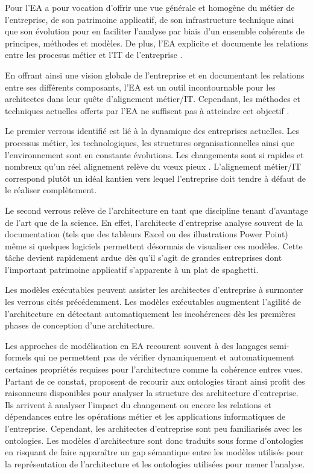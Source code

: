 	Pour \cite{lankhorst2013enterprise} l'EA a pour vocation d'offrir une vue générale et homogène du métier de l'entreprise, de son patrimoine applicatif, de son infrastructure technique ainsi que son évolution pour en faciliter l'analyse par biais d'un ensemble cohérents de principes, méthodes et modèles. De plus, l'EA explicite et documente les relations entre les procesus métier et l'IT de l'entreprise \cite{kaisler_enterprise_2005}. 
	
	En offrant ainsi une vision globale de l'entreprise et en documentant les relations entre ses différents composants, l'EA est un outil incontournable pour les architectes dans leur quête d'alignement métier/IT. Cependant, les méthodes et techniques actuelles offerts par l'EA ne suffisent pas à atteindre cet objectif \cite{barn2013enterprise}. 
	
	Le premier verrous identifié est lié à la dynamique des entreprises actuelles. Les processus métier, les technologiques, les structures organisationnelles ainsi que l'environnement sont en constante évolutions. Les changements sont si rapides et nombreux qu'un réel alignement relève du vœux pieux \cite{lankhorst2013enterprise}. L'alignement métier/IT correspond plutôt un idéal kantien vers lequel l'entreprise doit tendre à défaut de le réaliser complètement.
	
	Le second verrous relève de l'architecture en tant que discipline tenant d'avantage de l'art que de la science. En effet, l'architecte d'entreprise analyse souvent de la documentation (tels que des tableurs Excel ou des illustrations Power Point) même si quelques logiciels permettent désormais de visualiser ces modèles. Cette tâche devient rapidement ardue dès qu'il s'agit de grandes entreprises dont l'important patrimoine applicatif s'apparente à un plat de spaghetti.
	
	Les modèles exécutables peuvent assister les architectes d'entreprise à surmonter les verrous cités précédemment. Les modèles exécutables augmentent l'agilité de l'architecture en détectant automatiquement les incohérences dès les premières phases de conception d'une architecture. 
	
	Les approches de modélisation en EA recourent souvent à des langages semi-formels qui ne permettent pas de vérifier dynamiquement et automatiquement certaines propriétés requises pour l'architecture comme la cohérence entres vues. Partant de ce constat, \cite{sunkle_analyzing_2013} proposent de recourir aux ontologies tirant ainsi profit des raisonneurs disponibles pour analyser la structure des architecture d'entreprise. Ils arrivent à analyser l'impact du changement ou encore les relations et dépendances entre les opérations métier et les applications informatiques de l'entreprise. Cependant, les architectes d'entreprise sont peu familiarisés avec les ontologies. Les modèles d'architecture sont donc traduits sous forme d'ontologies en risquant de faire apparaître un gap sémantique entre les modèles utilisés pour la représentation de l'architecture et les ontologies utilisées pour mener l'analyse.
	
